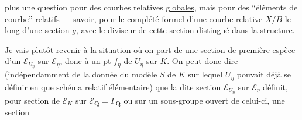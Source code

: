 plus une question pour des courbes relatives \uline{globales}, mais pour des ``éléments de courbe'' relatifs --- savoir, pour le complété formel d'une courbe relative $X/B$ le long d'une section $g$, avec le diviseur de cette section distingué dans la structure.

Je vais plutôt revenir à la situation où on part de une section de première espèce d'un $\mathcal E_{U_\eta}$ sur $\mathcal E_\eta$,  donc à un pt  $f_\eta$ de $U_\eta$ sur $K$. On peut donc dire (indépendamment de la donnée du modèle $S$ de $K$ sur lequel $U_\eta$ pouvait déjà se définir en  que schéma relatif élémentaire) que la dite section  $\mathcal E_{U_\eta}$ sur $\mathcal E_\eta$  définit, pour  section de $\mathcal E_K$ sur $\mathcal E_{\mathbf Q}=\Gamma_{\mathbf Q}$ ou sur un sous-groupe ouvert  de celui-ci, une section

